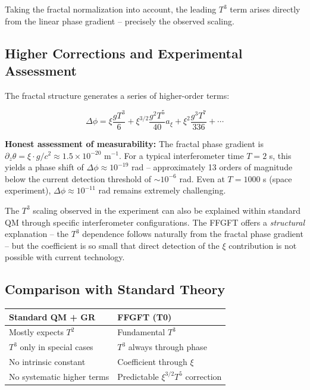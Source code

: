 	Taking the fractal normalization into account, the leading \(T^3\) term arises directly from the linear phase gradient -- precisely the observed scaling.
	
	\subsection*{Higher Corrections and Experimental Assessment}
	
	The fractal structure generates a series of higher-order terms:
	
	\begin{equation}
		\Delta \phi = \xi \frac{g T^3}{6} + \xi^{3/2} \frac{g^2 T^5}{40} a_\xi + \xi^2 \frac{g^3 T^7}{336} + \cdots
	\end{equation}
	
	\textbf{Honest assessment of measurability:} The fractal phase gradient is \(\partial_z \theta = \xi \cdot g/c^2 \approx 1.5 \times 10^{-20}\) m\(^{-1}\). For a typical interferometer time \(T = 2\) s, this yields a phase shift of \(\Delta\phi \approx 10^{-19}\) rad -- approximately 13 orders of magnitude below the current detection threshold of \(\sim 10^{-6}\) rad. Even at \(T = 1000\) s (space experiment), \(\Delta\phi \approx 10^{-11}\) rad remains extremely challenging.
	
	The \(T^3\) scaling observed in the experiment can also be explained within standard QM through specific interferometer configurations. The FFGFT offers a \textit{structural} explanation -- the \(T^3\) dependence follows naturally from the fractal phase gradient -- but the coefficient is so small that direct detection of the \(\xi\) contribution is not possible with current technology.
	
	\subsection*{Comparison with Standard Theory}
	
	\begin{center}
		\begin{tabular}{p{}p{}}
			\textbf{Standard QM + GR} & \textbf{FFGFT (T0)} \\
			\midrule
			Mostly expects \(T^2\) & Fundamental \(T^3\) \\
			\(T^3\) only in special cases & \(T^3\) always through phase \\
			No intrinsic constant & Coefficient through \(\xi\) \\
			No systematic higher terms & Predictable \(\xi^{3/2} T^5\) correction \\
		\end{tabular}
	\end{center}
	
